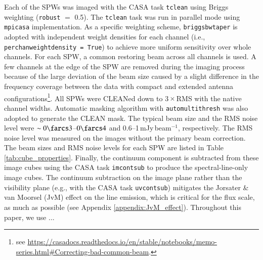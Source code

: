 \documentclass[linenumbers, twocolumn, twocolappendix, astrosymb, times]{aastex631}
\begin{document}
Each of the SPWs was imaged with the CASA task \texttt{tclean} \citep{Hogbom1974} using Briggs weighting (\texttt{robust} $=$ 0.5). The \texttt{tclean} task was run in parallel mode using \texttt{mpicasa} implementation. As a specific weighting scheme, \texttt{briggsbwtaper} is adopted with independent weight densities for each channel (i.e., \texttt{perchanweightdensity = True}) to achieve more uniform sensitivity over whole channels. For each SPW, a common restoring beam across all channels is used. A few channels at the edge of the SPW are removed during the imaging process because of the large deviation of the beam size caused by a slight difference in the frequency coverage between the data with compact and extended antenna configurations\footnote{see \url{https://casadocs.readthedocs.io/en/stable/notebooks/memo-series.html\#Correcting-bad-common-beam}.}. All SPWs were CLEANed down to 3\,$\times$\,RMS with the native channel widths. Automatic masking algorithm with \texttt{automultithresh} was also adopted to generate the CLEAN mask. The typical beam size and the RMS noise level were $\sim0\farcs3$--$0\farcs4$ and 0.6--1\,mJy\,beam$^{-1}$, respectively. The RMS noise level was measured on the images without the primary beam correction. The beam sizes and RMS noise levels for each SPW are listed in Table \ref{tab:cube_properties}. Finally, the continuum component is subtracted from these image cubes using the CASA task \texttt{imcontsub} to produce the spectral-line-only image cubes. The continuum subtraction on the image plane rather than the visibility plane (e.g., with the CASA task \texttt{uvcontsub}) mitigates the Jorsater \& van Moorsel (JvM) effect \citep{JvM, Czekala2021} on the line emission, which is critical for the flux scale, as much as possible (see Appendix \ref{appendix:JvM_effect}). Throughout this paper, we use ...
\end{document}
